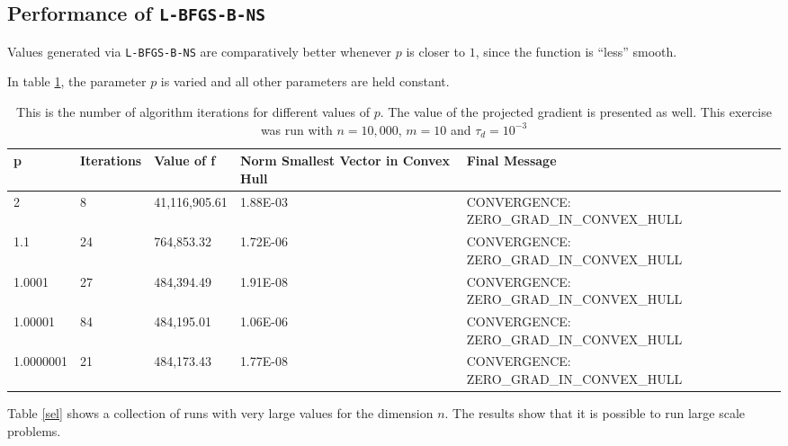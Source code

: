 \subsection{Performance of \texttt{L-BFGS-B-NS}}

Values generated via \texttt{L-BFGS-B-NS} are comparatively better whenever $p$ is closer to $1$, since the function is ``less'' smooth.

In table \ref{pmtable}, the parameter $p$ is varied and all other parameters are held constant.

\begin{center}
  \begin{table}
    \begin{tabular}{|l|l|l|p{1.6cm}|p{6cm}|}
      \hline
      p & Iterations & Value of f & Norm Smallest Vector in Convex Hull & Final Message\\ \hline
      2 & 8 & 41,116,905.61 & 1.88E-03 & CONVERGENCE: ZERO\_GRAD\_IN\_CONVEX\_HULL \\
      1.1 & 24 & 764,853.32 & 1.72E-06 & CONVERGENCE: ZERO\_GRAD\_IN\_CONVEX\_HULL \\ 
      1.0001 & 27 & 484,394.49 & 1.91E-08 & CONVERGENCE: ZERO\_GRAD\_IN\_CONVEX\_HULL \\ 
      1.00001 & 84 & 484,195.01 & 1.06E-06 & CONVERGENCE: ZERO\_GRAD\_IN\_CONVEX\_HULL \\ 
      1.0000001 & 21 & 484,173.43 & 1.77E-08 & CONVERGENCE: ZERO\_GRAD\_IN\_CONVEX\_HULL \\ \hline
    \end{tabular}
    \caption[Number of algorithm Iterations Changing $p$]{This is the number of algorithm iterations for different values of $p$. The value of the projected gradient is presented as well. This exercise was run with $n = 10,000$, $m = 10$ and $\tau_d = 10^{-3}$}
    \label{pmtable}
  \end{table}
\end{center}

Table \ref{sel} shows a collection of runs with very large values for the dimension $n$. The results show that it is possible to run large scale problems.

